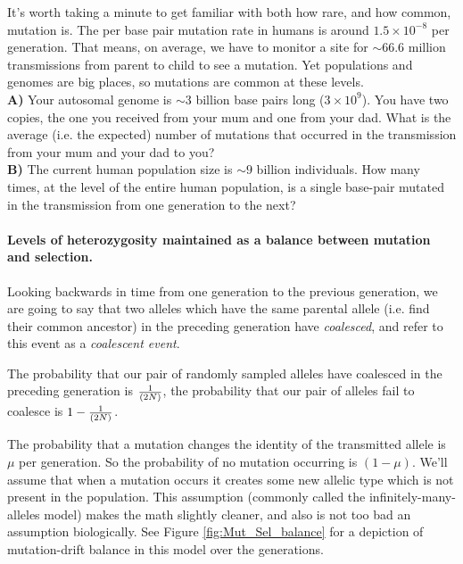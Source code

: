 \begin{question}
It's worth taking a minute to get familiar with both how rare, and how common, mutation is. The per base pair mutation rate in humans is around $1.5 \times 10^{-8}$ per generation. That means, on average, we have to monitor a site for $\sim 66.6$ million transmissions from parent to child to see a mutation. Yet populations and genomes are big places, so mutations are common at these levels. \\
{\bf A)} Your autosomal genome is $\sim 3$ billion base pairs long ($3 \times 10^9$). You have two copies, the one you received from your mum and one from your dad. What is the average (i.e. the expected) number of mutations that occurred in the transmission from your mum and your dad to you?\\
{\bf B)} The current human population size is $\sim 9$ billion individuals. How many times, at the level of the entire human population, is a single base-pair mutated in the transmission from one generation to the next? 
\end{question}
\paragraph{Levels of heterozygosity maintained as a balance between mutation and selection.}





Looking backwards in time from one generation to the previous generation, we are going to say that two alleles which have the same parental allele (i.e. find their common ancestor) in the preceding generation have \emph{coalesced}, and refer to this
event as a \emph{coalescent event}.

The probability that our pair of randomly sampled alleles have coalesced in the
preceding generation is $\nicefrac{1}{(2N)}$, the probability that our pair of
alleles fail to coalesce is $1-\nicefrac{1}{(2N)}$. 

The probability that a mutation changes the identity of the
transmitted allele is $\mu$ per generation. So the probability of no
mutation occurring is $(1-\mu)$. We'll assume that when a mutation
occurs it creates some new allelic type which is not present in the
population. This assumption (commonly called the infinitely-many-alleles model) makes the math slightly cleaner, and also
is not too bad an assumption biologically. See Figure
\ref{fig:Mut_Sel_balance} for a depiction of mutation-drift balance in
this model over the generations.

